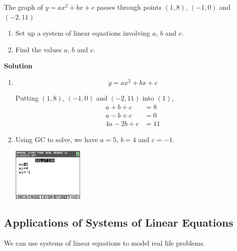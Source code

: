 \documentclass[11pt,a4paper]{book}
\begin{document}
\begin{example}{}

The graph of $y=ax^{2}+bx+c$ passes through points $\left(1,8\right)$,
$\left(-1,0\right)$ and $\left(-2,11\right)$

\begin{enumerate}[label=(\alph*)]

\item Set up a system of linear equations involving $a$, $b$ and
$c$.

\item Find the values $a$, $b$ and $c$.

\end{enumerate}

\textbf{Solution}

\begin{enumerate}[label=(\alph*)]

\item
\[
y=ax^{2}+bx+c\tag{1}
\]

Putting $\left(1,8\right)$, $\left(-1,0\right)$ and $\left(-2,11\right)$
into $\left(1\right)$,
\begin{align*}
a+b+c & =8\\
a-b+c & =0\\
4a-2b+c & =11
\end{align*}

\item Using GC to solve, we have $a=5$, $b=4$ and $c=-1$.

\begin{center}
\includegraphics[width=3.5cm]{lib/GC Screenshots/LinearEquationsA.png}
\end{center}

\end{enumerate}

\end{example}

\newpage

\subsection{Applications of Systems of Linear Equations}

We can use systems of linear equations to model real life problems.
\end{document}
